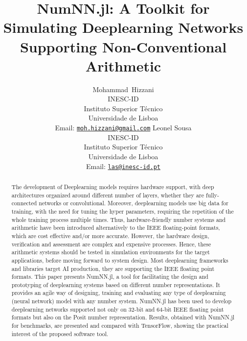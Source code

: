 \documentclass{article}
\title{NumNN.jl: A Toolkit for Simulating Deeplearning Networks Supporting Non-Conventional Arithmetic}
\author{%
	{Mohammad~Hizzani}\\
	INESC-ID\\ 
	Instituto Superior Técnico\\ 
		Universidade de Lisboa\\
		Email: \href{mailto:moh.hizzani@gmail.com}{\tt moh.hizzani@gmail.com}%
	\And
	{Leonel Sousa}\\
	INESC-ID\\ 
		Instituto Superior Técnico\\ 
		Universidade de Lisboa\\
		Email: \href{mailto:las@inesc-id.pt}{\tt las@inesc-id.pt}%
}
\begin{document}
	\maketitle

	\begin{abstract}
		The development of Deeplearning models requires hardware support, with deep architectures organized around different number of layers, whether they are fully-connected networks or convolutional. Moreover, deeplearning models use big data for training, with the need for tuning the hyper parameters, requiring the repetition of the whole training process multiple times. Thus, hardware-friendly number systems and arithmetic have been introduced alternatively to the IEEE floating-point formats, which are cost effective and/or more accurate. However, the hardware design, verification and assessment are complex and expensive processes. Hence, these arithmetic systems should be tested in simulation environments for the target applications, before moving forward to system design. Most deeplearning frameworks and libraries target AI production, they are supporting the IEEE floating point formats. This paper presents NumNN.jl, a tool for facilitating the design and prototyping of deeplearning systems based on different number representations. It provides an agile way of designing, training and evaluating any type of deeplearning (neural network) model with any number system. NumNN.jl has been used to develop deeplearning networks supported not only on 32-bit and 64-bit IEEE floating point formats but also on the Posit number representation.  Results, obtained with NumNN.jl for benchmarks, are presented and compared with TensorFlow, showing the practical interest of the proposed software tool.  
	\end{abstract}

	
	
	
	
	
%	
	
	
	
\end{document}
